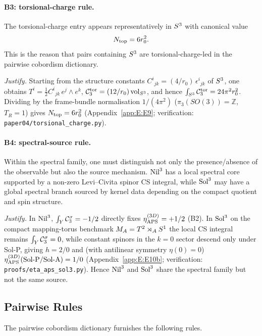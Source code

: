 \paragraph{B3: torsional-charge rule.}
The torsional-charge entry appears representatively in $S^3$ with
canonical value
\begin{equation}
  N_{\mathrm{top}} = 6 r_0^2.
\end{equation}
This is the reason that pairs containing $S^3$ are torsional-charge-led
in the pairwise cobordism dictionary.

\textit{Justify.}  Starting from the structure constants
$C^i{}_{jk} = (4/r_0)\,\epsilon^i{}_{jk}$ of $S^3$, one obtains
$T^i = \tfrac{1}{2}C^i{}_{jk}\,e^j\wedge e^k$,
$\mathcal{C}_3^{\mathrm{tor}} = (12/r_0)\,\mathrm{vol}_{S^3}$, and hence
$\int_{S^3}\mathcal{C}_3^{\mathrm{tor}} = 24\pi^2 r_0^2$.  Dividing by the frame-bundle
normalisation $1/(4\pi^2)$ ($\pi_3(SO(3)) = \mathbb{Z}$, $T_R = 1$) gives
$N_{\mathrm{top}} = 6 r_0^2$ (Appendix~\ref{app:E:E9}; verification:
\texttt{paper04/torsional\_charge.py}).

\paragraph{B4: spectral-source rule.}
Within the spectral family, one must distinguish not only the presence/absence
of the observable but also the source mechanism.  $\mathrm{Nil}^3$ has a local
spectral core supported by a non-zero Levi--Civita spinor CS integral, while
$\mathrm{Sol}^3$ may have a global spectral branch sourced by kernel data
depending on the compact quotient and spin structure.

\textit{Justify.}  In $\mathrm{Nil}^3$, $\int_Y\mathcal{C}_3^{\sigma} = -1/2$ directly fixes
$\eta_{\mathrm{APS}}^{(3D)} = +1/2$ (B2).  In $\mathrm{Sol}^3$ on the compact mapping-torus
benchmark $M_A = T^2\rtimes_A S^1$ the local CS integral remains
$\int_Y\mathcal{C}_3^{\sigma} = 0$, while constant spinors in the $k=0$ sector descend only
under Sol-P, giving $h = 2/0$ and (with antilinear symmetry $\eta(0)=0$)
$\eta_{\mathrm{APS}}^{(3D)}(\text{Sol-P/Sol-A}) = 1/0$ (Appendix~\ref{app:E:E10b};
verification: \texttt{proofs/eta\_aps\_sol3.py}).  Hence $\mathrm{Nil}^3$ and
$\mathrm{Sol}^3$ share the spectral family but not the same source.

\subsection{Pairwise Rules}
\label{sec:rules:pairwise}

The pairwise cobordism dictionary furnishes the following rules.

